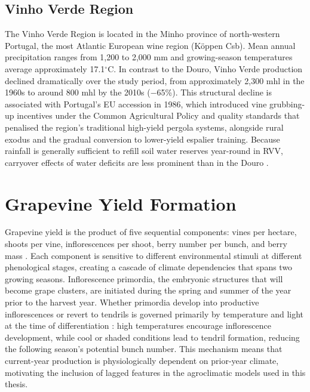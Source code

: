 \subsection{Vinho Verde Region}\label{sub:vinho_verde_region}

The Vinho Verde Region is located in the Minho province of north-western Portugal, the most Atlantic European wine region (Köppen Csb). Mean annual precipitation ranges from 1,200 to 2,000 mm and growing-season temperatures average approximately 17.1$^\circ$C. In contrast to the Douro, Vinho Verde production declined dramatically over the study period, from approximately 2,300 mhl in the 1960s to around 800 mhl by the 2010s ($-$65\%). This structural decline is associated with Portugal's EU accession in 1986, which introduced vine grubbing-up incentives under the Common Agricultural Policy and quality standards that penalised the region's traditional high-yield pergola systems, alongside rural exodus and the gradual conversion to lower-yield espalier training. Because rainfall is generally sufficient to refill soil water reserves year-round in RVV, carryover effects of water deficits are less prominent than in the Douro \citep{Cunha2020}.


\section{Grapevine Yield Formation}\label{sec:grapevine_yield_formation}

Grapevine yield is the product of five sequential components: vines per hectare, shoots per vine, inflorescences per shoot, berry number per bunch, and berry mass \citep{Zhu2020}. Each component is sensitive to different environmental stimuli at different phenological stages, creating a cascade of climate dependencies that spans two growing seasons. Inflorescence primordia, the embryonic structures that will become grape clusters, are initiated during the spring and summer of the year prior to the harvest year. Whether primordia develop into productive inflorescences or revert to tendrils is governed primarily by temperature and light at the time of differentiation \citep{Zhu2020}: high temperatures encourage inflorescence development, while cool or shaded conditions lead to tendril formation, reducing the following season's potential bunch number. This mechanism means that current-year production is physiologically dependent on prior-year climate, motivating the inclusion of lagged features in the agroclimatic models used in this thesis.


